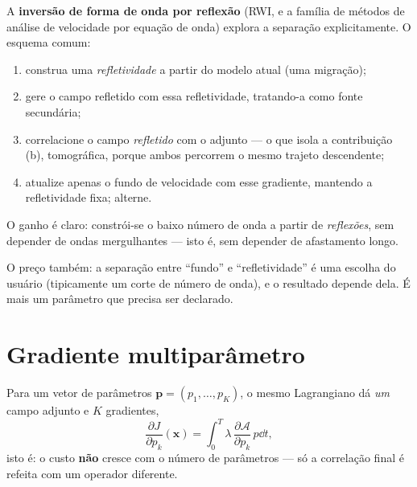 \documentclass[11pt,a4paper,oneside]{report}
\begin{document}
\begin{pratica}
A \textbf{invers\~ao de forma de onda por reflex\~ao} (RWI, e a fam\'ilia de
m\'etodos de an\'alise de velocidade por equa\c{c}\~ao de onda) explora a
separa\c{c}\~ao explicitamente. O esquema comum:
\begin{enumerate}[leftmargin=*, itemsep=1pt]
\item construa uma \emph{refletividade} a partir do modelo atual (uma
migra\c{c}\~ao);
\item gere o campo refletido com essa refletividade, tratando-a como fonte
secund\'aria;
\item correlacione o campo \emph{refletido} com o adjunto --- o que isola a
contribui\c{c}\~ao (b), tomogr\'afica, porque ambos percorrem o mesmo trajeto
descendente;
\item atualize apenas o fundo de velocidade com esse gradiente, mantendo a
refletividade fixa; alterne.
\end{enumerate}

O ganho \'e claro: constr\'oi-se o baixo n\'umero de onda a partir de
\emph{reflex\~oes}, sem depender de ondas mergulhantes --- isto \'e, sem
depender de afastamento longo.

O pre\c{c}o tamb\'em: a separa\c{c}\~ao entre ``fundo'' e ``refletividade'' \'e
uma escolha do usu\'ario (tipicamente um corte de n\'umero de onda), e o
resultado depende dela. \'E mais um par\^ametro que precisa ser declarado.
\end{pratica}

\section{Gradiente multipar\^ametro}

Para um vetor de par\^ametros $\mathbf{p} = (p_1,\dots,p_K)$, o mesmo
Lagrangiano d\'a \emph{um} campo adjunto e $K$ gradientes,
\begin{equation}
\frac{\partial J}{\partial p_k}(\mathbf{x})
 = \int_0^T \lambda\,
   \frac{\partial \mathcal{A}}{\partial p_k}\,p \dd t ,
\end{equation}
isto \'e: o custo \textbf{n\~ao} cresce com o n\'umero de par\^ametros --- s\'o
a correla\c{c}\~ao final \'e refeita com um operador diferente.
\end{document}
